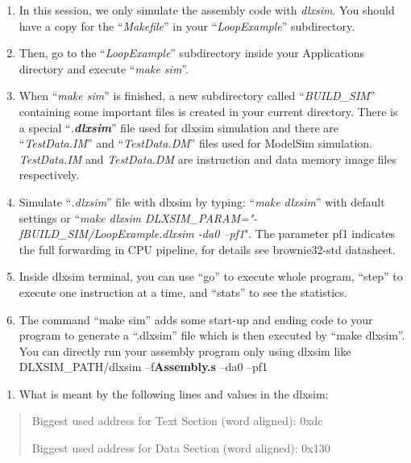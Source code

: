 \documentclass[
]{article}
\begin{document}
\begin{enumerate}
\def\labelenumi{\arabic{enumi}.}
\setcounter{enumi}{1}
\item
  In this session, we only simulate the assembly code with
  \emph{dlxsim}. You should have a copy for the ``\emph{Makefile}'' in
  your ``\emph{LoopExample}'' subdirectory.
\item
  Then, go to the ``\emph{LoopExample}'' subdirectory inside your
  Applications directory and execute ``\emph{make sim}''.
\item
  When ``\emph{make sim}'' is finished, a new subdirectory called
  ``\emph{BUILD\_SIM}'' containing some important files is created in
  your current directory. There is a special ``\emph{.\textbf{dlxsim}}''
  file used for dlxsim simulation and there are ``\emph{TestData.IM}''
  and ``\emph{TestData.DM}'' files used for ModelSim simulation.
  \emph{TestData.IM} and \emph{TestData.DM} are instruction and data
  memory image files respectively.
\item
  Simulate ``\emph{.dlxsim}'' file with dlxsim by typing: ``\emph{make
  dlxsim}'' with default settings or ``\emph{make dlxsim
  DLXSIM\_PARAM="-fBUILD\_SIM/LoopExample.dlxsim -da0 --pf1}". The
  parameter pf1 indicates the full forwarding in CPU pipeline, for
  details see brownie32-std datasheet.
\item
  Inside dlxsim terminal, you can use ``go'' to execute whole program,
  ``step'' to execute one instruction at a time, and ``stats'' to see
  the statistics.
\item
  The command ``make sim'' adds some start-up and ending code to your
  program to generate a ``.dlxsim'' file which is then executed by
  ``make dlxsim''. You can directly run your assembly program only using
  dlxsim like DLXSIM\_PATH/dlxsim --f\textbf{Assembly.s} --da0 --pf1
\end{enumerate}

\begin{enumerate}
\def\labelenumi{\alph{enumi})}
\item
  What is meant by the following lines and values in the dlxsim:
\end{enumerate}

\begin{quote}
Biggest used address for Text Section (word aligned): 0xdc

Biggest used address for Data Section (word aligned): 0x130
\end{quote}
\end{document}
